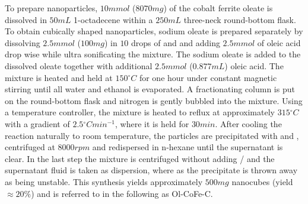 \documentclass[\main/dresen_thesis.tex]{subfiles}
\begin{document}
    To prepare nanoparticles, $10 \unit{mmol}$ ($8070 \unit{mg}$) of the cobalt ferrite oleate is dissolved in $50 \unit{mL}$ 1-octadecene within a $250 \unit{mL}$ three-neck round-bottom flask.
    To obtain cubically shaped nanoparticles, sodium oleate is prepared separately by dissolving $2.5 \unit{mmol}$ ($100 \unit{mg}$)  in $10$ drops of  and  and adding $2.5 \unit{mmol}$ of oleic acid drop wise while ultra sonificating the mixture.
    The sodium oleate is added to the dissolved oleate together with additional $2.5 \unit{mmol}$ ($0.877 \unit{mL}$) oleic acid.
    The mixture is heated and held at $150 \unit{^\circ C}$ for one hour under constant magnetic stirring until all water and ethanol is evaporated.
    A fractionating column is put on the round-bottom flask and nitrogen is gently bubbled into the mixture.
    Using a temperature controller, the mixture is heated to reflux at approximately $315 \unit{^\circ C}$ with a gradient of $2.5 \unit{^\circ C min^{-1}}$, where it is held for $30 \unit{min}$.
    After cooling the reaction naturally to room temperature, the particles are precipitated with  and , centrifuged at $8000 \unit{rpm}$ and redispersed in n-hexane until the supernatant is clear.
    In the last step the mixture is centrifuged without adding / and the supernatant fluid is taken as dispersion, where as the precipitate is thrown away as being unstable.
    This synthesis yields approximately $500 \unit{mg}$ nanocubes (yield $\approx 20 \%$) and is referred to in the following as Ol-CoFe-C.
\end{document}
